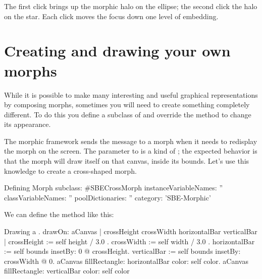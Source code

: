 \documentclass[a4paper,10pt,twoside]{book}
\begin{document}
\noindent
The first click brings up the morphic halo on the ellipse; the second click the halo on the star.
Each click moves the focus down one level of embedding.


\section{Creating and drawing your own morphs}

While it is possible to make many interesting and useful graphical representations by composing morphs, sometimes you will need to create something completely different.
To do this you define a subclass of  and override the  method to change its appearance.

The morphic framework sends the message  to a morph when it needs to redisplay the morph on the screen.
The parameter to  is a kind of ; the expected behavior is that the morph will draw itself on that canvas, inside its bounds.
Let's use this knowledge to create a cross-shaped morph.

\begin{classdef}{Defining }
Morph subclass: #SBECrossMorph
	instanceVariableNames: ''
	classVariableNames: ''
	poolDictionaries: ''
	category: 'SBE-Morphic'
\end{classdef}

We can define the  method like this:
\begin{method}[firstDrawOn]{Drawing a .}
drawOn: aCanvas 
	| crossHeight crossWidth horizontalBar verticalBar |
	crossHeight := self height / 3.0 .
	crossWidth := self width / 3.0 .
	horizontalBar := self bounds insetBy: 0 @ crossHeight.
	verticalBar := self bounds insetBy: crossWidth @ 0.
	aCanvas fillRectangle: horizontalBar color: self color.
	aCanvas fillRectangle: verticalBar color: self color
\end{method}
\end{document}
